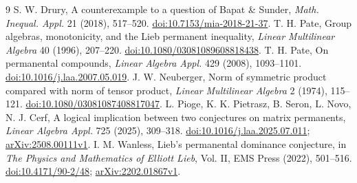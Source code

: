 \documentclass[11pt]{article}
\begin{document}
\clearpage
\begin{thebibliography}{9}
 S. W. Drury, A counterexample to a question of Bapat \& Sunder,
\emph{Math. Inequal. Appl.} 21 (2018), 517--520.
\href{https://doi.org/10.7153/mia-2018-21-37}{doi:10.7153/mia-2018-21-37}.
 T. H. Pate, Group algebras, monotonicity, and the Lieb permanent
inequality, \emph{Linear Multilinear Algebra} 40 (1996), 207--220.
\href{https://doi.org/10.1080/03081089608818438}{doi:10.1080/03081089608818438}.
 T. H. Pate, On permanental compounds,
\emph{Linear Algebra Appl.} 429 (2008), 1093--1101.
\href{https://doi.org/10.1016/j.laa.2007.05.019}{doi:10.1016/j.laa.2007.05.019}.
 J. W. Neuberger, Norm of symmetric product compared with norm
of tensor product, \emph{Linear Multilinear Algebra} 2 (1974), 115--121.
\href{https://doi.org/10.1080/03081087408817047}{doi:10.1080/03081087408817047}.
 L. Pioge, K. K. Pietrasz, B. Seron, L. Novo, N. J. Cerf,
A logical implication between two conjectures on matrix permanents,
\emph{Linear Algebra Appl.} 725 (2025), 309--318.
\href{https://doi.org/10.1016/j.laa.2025.07.011}{doi:10.1016/j.laa.2025.07.011};
\href{https://arxiv.org/abs/2508.00111v1}{arXiv:2508.00111v1}.
 I. M. Wanless, Lieb's permanental dominance conjecture,
in \emph{The Physics and Mathematics of Elliott Lieb}, Vol. II,
EMS Press (2022), 501--516.
\href{https://doi.org/10.4171/90-2/48}{doi:10.4171/90-2/48};
\href{https://arxiv.org/abs/2202.01867v1}{arXiv:2202.01867v1}.
\end{thebibliography}
\end{document}
